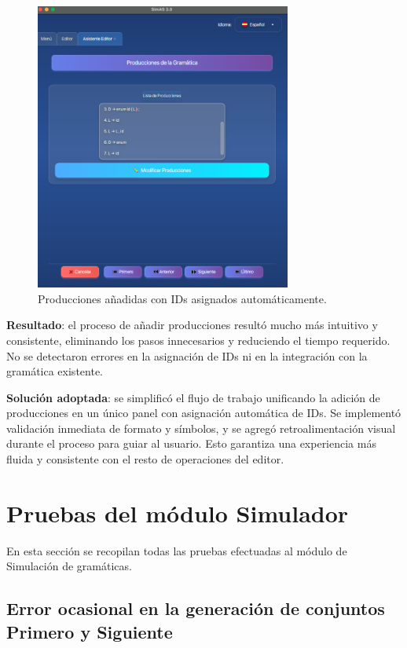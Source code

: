 \needspace{6cm}
\begin{figure}[H]
  \centering
  \includegraphics[width=0.75\textwidth]{figuras2/pruebas/editor/new_prod.png}
  \caption{Producciones añadidas con IDs asignados automáticamente.}
\end{figure}

\textbf{Resultado}: el proceso de añadir producciones resultó mucho más intuitivo y consistente, eliminando los pasos innecesarios y reduciendo el tiempo requerido. No se detectaron errores en la asignación de IDs ni en la integración con la gramática existente.
\medskip

\textbf{Solución adoptada}: se simplificó el flujo de trabajo unificando la adición de producciones en un único panel con asignación automática de IDs. Se implementó validación inmediata de formato y símbolos, y se agregó retroalimentación visual durante el proceso para guiar al usuario. Esto garantiza una experiencia más fluida y consistente con el resto de operaciones del editor.


\section{Pruebas del módulo Simulador}

En esta sección se recopilan todas las pruebas efectuadas al módulo de Simulación de gramáticas.

\subsection{Error ocasional en la generación de conjuntos Primero y Siguiente}

